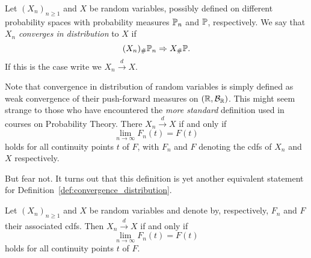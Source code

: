 \begin{definition}\label{def:convergence_distribution}
Let $(X_n)_{n \ge 1}$ and $X$ be random variables, possibly defined on different probability spaces with probability measures $\mathbb P_n$ and $\mathbb P$, respectively. We say that $X_n$ \emph{converges in distribution} to $X$ if
\[
	(X_n)_\# \mathbb P_n \Rightarrow X_\# \mathbb P.
\]
If this is the case write we $X_n \stackrel{d}{\rightarrow} X$.
\end{definition}

Note that convergence in distribution of random variables is simply defined as weak convergence of their push-forward measures on $(\mathbb R, \mathcal B_{\mathbb R})$. This might seem strange to those who have encountered the \emph{more standard} definition used in courses on Probability Theory. There $X_n \stackrel{d}{\rightarrow} X$ if and only if
\[
	\lim_{n \to \infty} F_n(t) = F(t)
\]
holds for all continuity points $t$ of $F$, with $F_n$ and $F$ denoting the cdfs of $X_n$ and $X$ respectively.

But fear not. It turns out that this definition is yet another equivalent statement for Definition~\ref{def:convergence_distribution}. 


\begin{lemma}\label{lem:convergence_distribution_cdfs}
Let $(X_n)_{n \ge 1}$ and $X$ be random variables and denote by, respectively, $F_n$ and $F$ their associated cdfs. Then
$X_n \stackrel{d}{\rightarrow} X$ if and only if
\[
	\lim_{n \to \infty} F_n(t) = F(t)
\]
holds for all continuity points $t$ of $F$.
\end{lemma}


